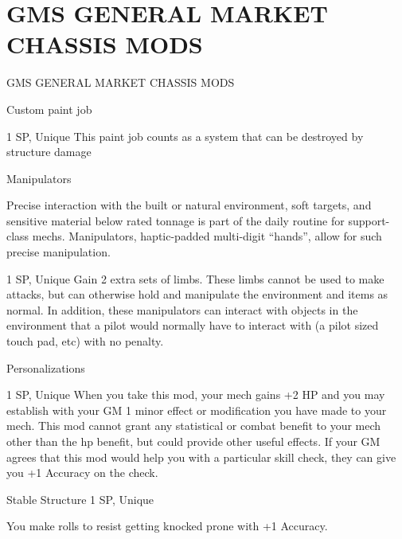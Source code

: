 \section{GMS GENERAL MARKET CHASSIS MODS}
                       GMS GENERAL MARKET CHASSIS MODS


Custom paint job

1 SP, Unique
This paint job counts as a system that can be destroyed by structure damage


Manipulators




Precise interaction with the built or natural environment, soft targets, and sensitive material below rated
tonnage is part of the daily routine for support-class mechs. Manipulators, haptic-padded multi-digit
“hands”, allow for such precise manipulation.

1 SP, Unique
Gain 2 extra sets of limbs. These limbs cannot be used to make attacks, but can otherwise hold
and manipulate the environment and items as normal. In addition, these manipulators can
interact with objects in the environment that a pilot would normally have to interact with (a pilot
sized touch pad, etc) with no penalty.


Personalizations

1 SP, Unique
When you take this mod, your mech gains +2 HP and you may establish with your GM 1 minor
effect or modification you have made to your mech. This mod cannot grant any statistical or
combat benefit to your mech other than the hp benefit, but could provide other useful effects. If
your GM agrees that this mod would help you with a particular skill check, they can give you +1
Accuracy on the check.


Stable Structure
1 SP, Unique

You make rolls to resist getting knocked prone with +1 Accuracy.